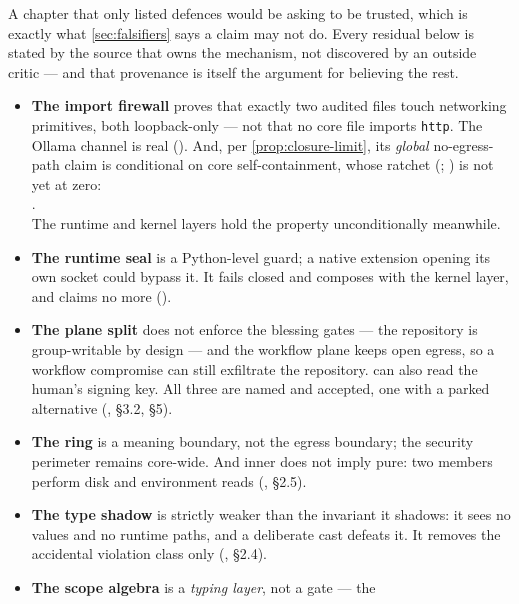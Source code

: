 A chapter that only listed defences would be asking to be trusted, which is exactly
what \autoref{sec:falsifiers} says a claim may not do. Every residual below is
stated by the source that owns the mechanism, not discovered by an outside critic
--- and that provenance is itself the argument for believing the rest.

\begin{itemize}[leftmargin=*]
  \item \textbf{The import firewall} proves that exactly two audited files touch
    networking primitives, both loopback-only --- not that no core file imports
    \texttt{http}. The Ollama channel is real
    (). And, per
    \autoref{prop:closure-limit}, its \emph{global} no-egress-path claim is
    conditional on core self-containment, whose ratchet
    (; ) is not yet at zero:\\
    \hspace*{1em}.\\
    The runtime and kernel layers hold the property unconditionally meanwhile.
  \item \textbf{The runtime seal} is a Python-level guard; a native extension
    opening its own socket could bypass it. It fails closed and composes with the
    kernel layer, and claims no more ().
  \item \textbf{The plane split} does not enforce the blessing gates --- the
    repository is group-writable by design --- and the workflow plane keeps open
    egress, so a workflow compromise can still exfiltrate the repository. \pwork{}
    can also read the human's signing key. All three are named and accepted, one
    with a parked alternative (, \S 3.2, \S 5).
  \item \textbf{The ring} is a meaning boundary, not the egress boundary; the
    security perimeter remains core-wide. And inner does not imply pure: two
    members perform disk and environment reads (,
    \S 2.5).
  \item \textbf{The type shadow} is strictly weaker than the invariant it shadows:
    it sees no values and no runtime paths, and a deliberate cast defeats it. It
    removes the accidental violation class only
    (, \S 2.4).
  \item \textbf{The scope algebra} is a \emph{typing layer}, not a gate --- the

\end{itemize}
